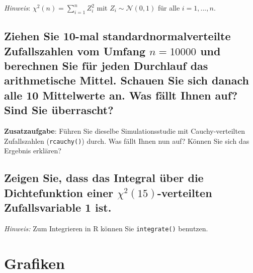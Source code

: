 \documentclass[12pt,a4paper]{article}
\begin{document}
\emph{Hinweis}: \(\chi^2(n)=\sum_{i=1}^n Z_i^2\) mit
\(Z_i\sim\mathcal{N}(0,1)\) für alle \(i=1,...,n\).

\hypertarget{ziehen-sie-10-mal-standardnormalverteilte-zufallszahlen-vom-umfang-n-10000-und-berechnen-sie-fuxfcr-jeden-durchlauf-das-arithmetische-mittel.-schauen-sie-sich-danach-alle-10-mittelwerte-an.-was-fuxe4llt-ihnen-auf-sind-sie-uxfcberrascht}{%
\subsection{\texorpdfstring{Ziehen Sie 10-mal standardnormalverteilte
Zufallszahlen vom Umfang \(n = 10000\) und berechnen Sie für jeden
Durchlauf das arithmetische Mittel. Schauen Sie sich danach alle 10
Mittelwerte an. Was fällt Ihnen auf? Sind Sie
überrascht?}{Ziehen Sie 10-mal standardnormalverteilte Zufallszahlen vom Umfang n = 10000 und berechnen Sie für jeden Durchlauf das arithmetische Mittel. Schauen Sie sich danach alle 10 Mittelwerte an. Was fällt Ihnen auf? Sind Sie überrascht?}}\label{ziehen-sie-10-mal-standardnormalverteilte-zufallszahlen-vom-umfang-n-10000-und-berechnen-sie-fuxfcr-jeden-durchlauf-das-arithmetische-mittel.-schauen-sie-sich-danach-alle-10-mittelwerte-an.-was-fuxe4llt-ihnen-auf-sind-sie-uxfcberrascht}}

\textbf{Zusatzaufgabe}: Führen Sie dieselbe Simulationsstudie mit
Cauchy-verteilten Zufallszahlen (\texttt{rcauchy()}) durch. Was fällt
Ihnen nun auf? Können Sie sich das Ergebnis erklären?

\hypertarget{zeigen-sie-dass-das-integral-uxfcber-die-dichtefunktion-einer-chi215-verteilten-zufallsvariable-1-ist.}{%
\subsection{\texorpdfstring{Zeigen Sie, dass das Integral über die
Dichtefunktion einer \(\chi^2(15)\)-verteilten Zufallsvariable 1
ist.}{Zeigen Sie, dass das Integral über die Dichtefunktion einer \textbackslash chi\^{}2(15)-verteilten Zufallsvariable 1 ist.}}\label{zeigen-sie-dass-das-integral-uxfcber-die-dichtefunktion-einer-chi215-verteilten-zufallsvariable-1-ist.}}

\emph{Hinweis:} Zum Integrieren in R können Sie \texttt{integrate()}
benutzen.

\hypertarget{grafiken}{%
\section{Grafiken}\label{grafiken}}
\end{document}

